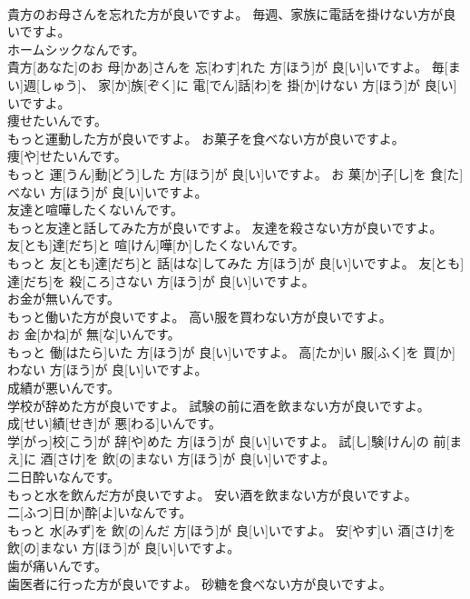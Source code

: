 \documentclass[8pt]{extreport}
\begin{document}
\begin{CJK}{UTF8}{min}
\\	貴方のお母さんを忘れた方が良いですよ。 毎週、家族に電話を掛けない方が良いですよ。	
\\	ホームシックなんです。 
\\	貴方[あなた]のお 母[かあ]さんを 忘[わす]れた 方[ほう]が 良[い]いですよ。 毎[まい]週[しゅう]、 家[か]族[ぞく]に 電[でん]話[わ]を 掛[か]けない 方[ほう]が 良[い]いですよ。
\\	痩せたいんです。 
\\	もっと運動した方が良いですよ。 お菓子を食べない方が良いですよ。	
\\	痩[や]せたいんです。 
\\	もっと 運[うん]動[どう]した 方[ほう]が 良[い]いですよ。 お 菓[か]子[し]を 食[た]べない 方[ほう]が 良[い]いですよ。
\\	友達と喧嘩したくないんです。 
\\	もっと友達と話してみた方が良いですよ。 友達を殺さない方が良いですよ。	
\\	友[とも]達[だち]と 喧[けん]嘩[か]したくないんです。 
\\	もっと 友[とも]達[だち]と 話[はな]してみた 方[ほう]が 良[い]いですよ。 友[とも]達[だち]を 殺[ころ]さない 方[ほう]が 良[い]いですよ。
\\	お金が無いんです。 
\\	もっと働いた方が良いですよ。 高い服を買わない方が良いですよ。	
\\	お 金[かね]が 無[な]いんです。 
\\	もっと 働[はたら]いた 方[ほう]が 良[い]いですよ。 高[たか]い 服[ふく]を 買[か]わない 方[ほう]が 良[い]いですよ。
\\	成績が悪いんです。 
\\	学校が辞めた方が良いですよ。 試験の前に酒を飲まない方が良いですよ。	
\\	成[せい]績[せき]が 悪[わる]いんです。 
\\	学[がっ]校[こう]が 辞[や]めた 方[ほう]が 良[い]いですよ。 試[し]験[けん]の 前[まえ]に 酒[さけ]を 飲[の]まない 方[ほう]が 良[い]いですよ。
\\	二日酔いなんです。 
\\	もっと水を飲んだ方が良いですよ。 安い酒を飲まない方が良いですよ。	
\\	二[ふつ]日[か]酔[よ]いなんです。 
\\	もっと 水[みず]を 飲[の]んだ 方[ほう]が 良[い]いですよ。 安[やす]い 酒[さけ]を 飲[の]まない 方[ほう]が 良[い]いですよ。
\\	歯が痛いんです。 
\\	歯医者に行った方が良いですよ。 砂糖を食べない方が良いですよ。	

\end{CJK}
\end{document}
